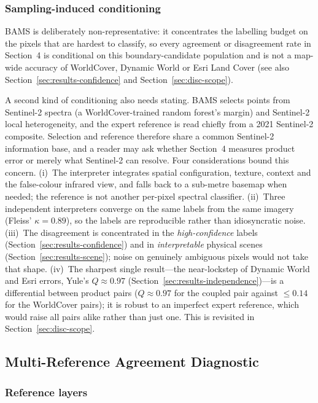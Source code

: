 \subsubsection*{Sampling-induced conditioning}

BAMS is deliberately non-representative: it concentrates the labelling budget on
the pixels that are hardest to classify, so every agreement or disagreement rate
in Section~4 is conditional on this boundary-candidate population and is not a
map-wide accuracy of WorldCover, Dynamic World or Esri Land Cover (see also
Section~\ref{sec:results-confidence} and Section~\ref{sec:disc-scope}).

A second kind of conditioning also needs stating. BAMS selects points from
Sentinel-2 spectra (a WorldCover-trained random forest's margin) and Sentinel-2
local heterogeneity, and the expert reference is read chiefly from a 2021
Sentinel-2 composite. Selection and reference therefore share a common
Sentinel-2 information base, and a reader may ask whether Section~4 measures
product error or merely what Sentinel-2 can resolve. Four considerations bound
this concern. (i)~The interpreter integrates spatial configuration, texture,
context and the false-colour infrared view, and falls back to a sub-metre
basemap when needed; the reference is not another per-pixel spectral classifier.
(ii)~Three independent interpreters converge on the same labels from the same
imagery (Fleiss' $\kappa = 0.89$), so the labels are reproducible rather than
idiosyncratic noise. (iii)~The disagreement is concentrated in the
\emph{high-confidence} labels (Section~\ref{sec:results-confidence}) and in
\emph{interpretable} physical scenes (Section~\ref{sec:results-scene}); noise on
genuinely ambiguous pixels would not take that shape. (iv)~The sharpest single
result---the near-lockstep of Dynamic World and Esri errors, Yule's
$Q \approx 0.97$ (Section~\ref{sec:results-independence})---is a differential
between product pairs ($Q \approx 0.97$ for the coupled pair against $\le 0.14$
for the WorldCover pairs); it is robust to an imperfect expert reference, which
would raise all pairs alike rather than just one. This is revisited in
Section~\ref{sec:disc-scope}.

\subsection{Multi-Reference Agreement Diagnostic}\label{sec:diagnostic}

\subsubsection*{Reference layers}

